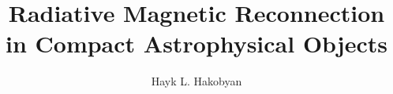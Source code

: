\title{Radiative Magnetic Reconnection in Compact Astrophysical Objects}
\author{Hayk L. Hakobyan}


